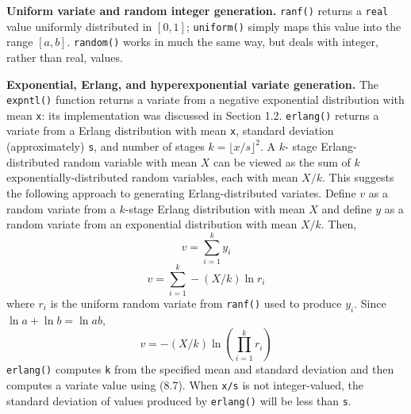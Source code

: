 \textbf{Uniform variate and random integer generation.} \texttt{ranf()} returns a \texttt{real}
value uniformly distributed in $[0,1]$; \texttt{uniform()} simply maps this value into
the range $[a,b]$. \texttt{random()} works in much the same way, but deals with
integer, rather than real, values.

\textbf{Exponential, Erlang, and hyperexponential variate generation.} The
\texttt{expntl()} function returns a variate from a negative exponential distribution
with mean \texttt{x}: its implementation was discussed in Section 1.2.
\texttt{erlang()} returns a variate from a Erlang distribution with mean \texttt{x},
standard deviation (approximately) \texttt{s}, and number of stages $k=\lfloor x/s\rfloor^2$. A $k$-
stage Erlang-distributed random variable with mean $X$ can be viewed as the
sum of $k$ exponentially-distributed random variables, each with mean $X/k$.
This suggests the following approach to generating Erlang-distributed
variates. Define $v$ as a random variate from a $k$-stage Erlang distribution
with mean $X$ and define $y$ as a random variate from an exponential
distribution with mean $X/k$. Then,
\begin{equation}
v=\sum_{i=1}^{k} y_i
\end{equation}
\begin{equation}
v=\sum_{i=1}^{k} -(X/k)\ln r_i
\end{equation}
where $r_i$ is the uniform random variate from \texttt{ranf()} used to produce $y_i$.
Since $\ln a+\ln b=\ln ab$,
\begin{equation}
v=-(X/k)\ln\left(\prod_{i=1}^{k}r_i\right)
\end{equation}
\texttt{erlang()} computes \texttt{k} from the specified mean and standard deviation and
then computes a variate value using (8.7). When \texttt{x/s} is not integer-valued,
the standard deviation of values produced by \texttt{erlang()} will be less than \texttt{s}.

